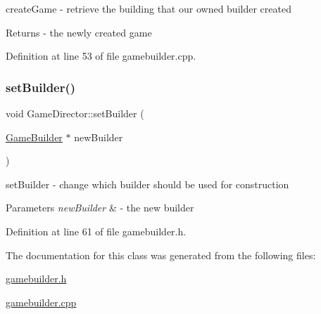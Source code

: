 create\+Game -\/ retrieve the building that our owned builder created 

\begin{DoxyReturn}{Returns}
-\/ the newly created game 
\end{DoxyReturn}


Definition at line 53 of file gamebuilder.\+cpp.

\mbox{\label{class_game_director_af849b0b8309680e7eb53cc1803895aab}} 
\subsubsection{\texorpdfstring{set\+Builder()}{setBuilder()}}
{\footnotesize\ttfamily void Game\+Director\+::set\+Builder (\begin{DoxyParamCaption}\item[{\mbox{\hyperlink{class_game_builder}{Game\+Builder}} $\ast$}]{new\+Builder }\end{DoxyParamCaption})\hspace{0.3cm}{\ttfamily [inline]}}



set\+Builder -\/ change which builder should be used for construction 


\begin{DoxyParams}{Parameters}
{\em new\+Builder} & -\/ the new builder \\
\hline
\end{DoxyParams}


Definition at line 61 of file gamebuilder.\+h.



The documentation for this class was generated from the following files\+:\begin{DoxyCompactItemize}
\item 
\mbox{\hyperlink{gamebuilder_8h}{gamebuilder.\+h}}\item 
\mbox{\hyperlink{gamebuilder_8cpp}{gamebuilder.\+cpp}}\end{DoxyCompactItemize}
